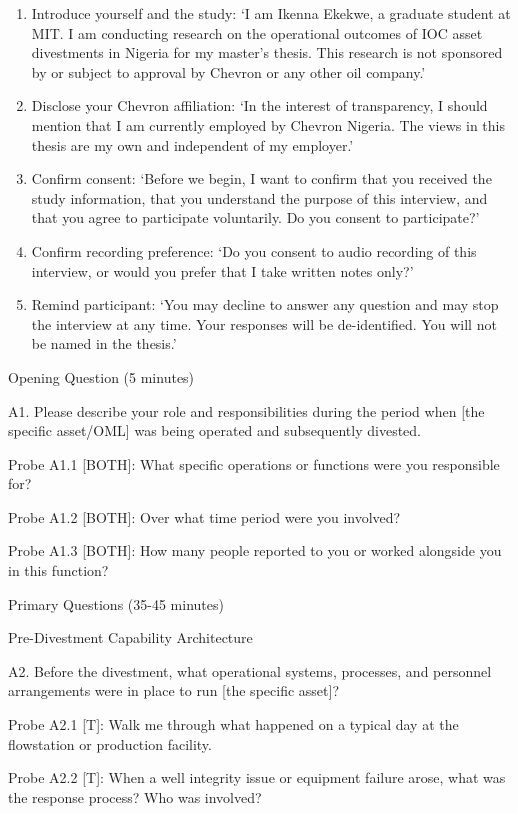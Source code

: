 \begin{enumerate}
\def\labelenumi{\arabic{enumi}.}
\item
  Introduce yourself and the study: `I am Ikenna Ekekwe, a graduate
  student at MIT. I am conducting research on the operational outcomes
  of IOC asset divestments in Nigeria for my master's thesis. This
  research is not sponsored by or subject to approval by Chevron or any
  other oil company.'
\item
  Disclose your Chevron affiliation: `In the interest of transparency, I
  should mention that I am currently employed by Chevron Nigeria. The
  views in this thesis are my own and independent of my employer.'
\item
  Confirm consent: `Before we begin, I want to confirm that you received
  the study information, that you understand the purpose of this
  interview, and that you agree to participate voluntarily. Do you
  consent to participate?'
\item
  Confirm recording preference: `Do you consent to audio recording of
  this interview, or would you prefer that I take written notes only?'
\item
  Remind participant: `You may decline to answer any question and may
  stop the interview at any time. Your responses will be de-identified.
  You will not be named in the thesis.'
\end{enumerate}

Opening Question (5 minutes)

A1. Please describe your role and responsibilities during the period
when {[}the specific asset/OML{]} was being operated and subsequently
divested.

Probe A1.1 {[}BOTH{]}: What specific operations or functions were you
responsible for?

Probe A1.2 {[}BOTH{]}: Over what time period were you involved?

Probe A1.3 {[}BOTH{]}: How many people reported to you or worked
alongside you in this function?

Primary Questions (35-45 minutes)

Pre-Divestment Capability Architecture

A2. Before the divestment, what operational systems, processes, and
personnel arrangements were in place to run {[}the specific asset{]}?

Probe A2.1 {[}T{]}: Walk me through what happened on a typical day at
the flowstation or production facility.

Probe A2.2 {[}T{]}: When a well integrity issue or equipment failure
arose, what was the response process? Who was involved?

